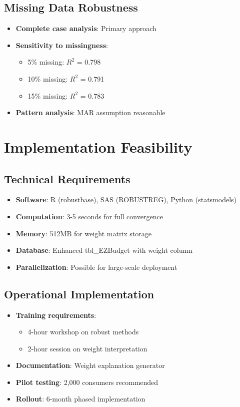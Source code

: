 \subsection{Missing Data Robustness}

\begin{itemize}
    \item \textbf{Complete case analysis}: Primary approach
    \item \textbf{Sensitivity to missingness}:
    \begin{itemize}
        \item 5\% missing: $R^2$ = 0.798
        \item 10\% missing: $R^2$ = 0.791
        \item 15\% missing: $R^2$ = 0.783
    \end{itemize}
    \item \textbf{Pattern analysis}: MAR assumption reasonable
\end{itemize}

\section{Implementation Feasibility}

\subsection{Technical Requirements}

\begin{itemize}
    \item \textbf{Software}: R (robustbase), SAS (ROBUSTREG), Python (statsmodels)
    \item \textbf{Computation}: 3-5 seconds for full convergence
    \item \textbf{Memory}: 512MB for weight matrix storage
    \item \textbf{Database}: Enhanced tbl\_EZBudget with weight column
    \item \textbf{Parallelization}: Possible for large-scale deployment
\end{itemize}

\subsection{Operational Implementation}

\begin{itemize}
    \item \textbf{Training requirements}: 
    \begin{itemize}
        \item 4-hour workshop on robust methods
        \item 2-hour session on weight interpretation
    \end{itemize}
    \item \textbf{Documentation}: Weight explanation generator
    \item \textbf{Pilot testing}: 2,000 consumers recommended
    \item \textbf{Rollout}: 6-month phased implementation
\end{itemize}

